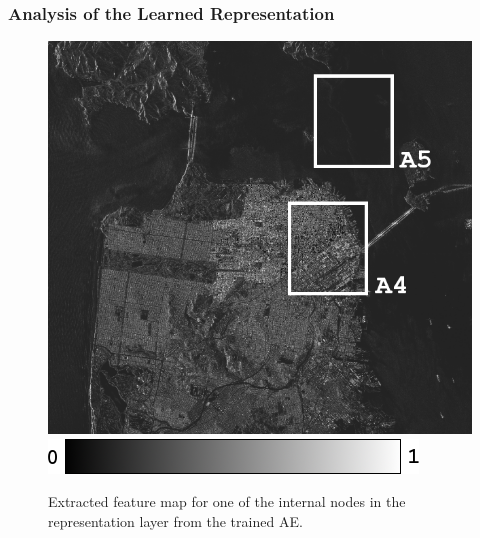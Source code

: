 \subsubsection{Analysis of the Learned Representation}
\label{sec:EXPT3}

\begin{figure}[!t]
	\centering
	\includegraphics[width=0.85\columnwidth]{Figures/Wr_decode3_11_g}
	\\
	\includegraphics[width = 0.3\columnwidth]{Figures/Rotation_FS/GRAY}
	\caption{Extracted feature map for one of the internal nodes in the representation layer from the trained AE.}
	\label{fig:wr}
\end{figure}

